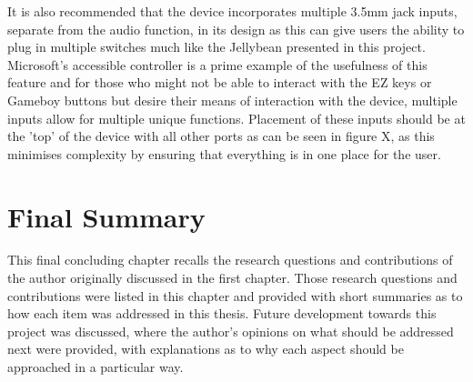 It is also recommended that the device incorporates multiple 3.5mm jack inputs, separate from the audio function, in its design as this can give users the ability to plug in multiple switches much like the Jellybean presented in this project.
Microsoft's accessible controller \cite{adaptive} is a prime example of the usefulness of this feature and for those who might not be able to interact with the EZ keys or Gameboy buttons but desire their means of interaction with the device, multiple inputs allow for multiple unique functions.
Placement of these inputs should be at the 'top' of the device with all other ports as can be seen in figure X, as this minimises complexity by ensuring that everything is in one place for the user.



\section{Final Summary}
This final concluding chapter recalls the research questions and contributions of the author originally discussed in the first chapter.
Those research questions and contributions were listed in this chapter and provided with short summaries as to how each item was addressed in this thesis.
Future development towards this project was discussed, where the author's opinions on what should be addressed next were provided, with explanations as to why each aspect should be approached in a particular way.

